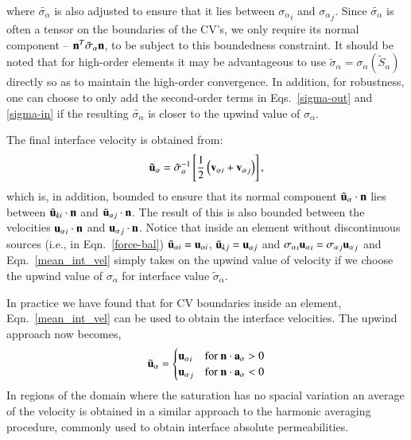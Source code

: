 \documentclass[preprint,authoryear,12pt]{elsarticle}
\newcommand{\jrp}[1]{\todo[color=blue!30, size=\small]{JRP: #1}}
\begin{document}
where $\tilde{\sigma_{\alpha}}$ is also adjusted to ensure that it lies between ${\sigma_\alpha}_i$ and ${\sigma_\alpha}_j$. Since $\tilde{\sigma_{\alpha}}$ is often a tensor on the boundaries of the CV's, we only require its normal component -- ${\bf n}^T\tilde\sigma_\alpha {\bf n}$, to be subject to this boundedness constraint. It should be noted that for high-order elements it may be advantageous to use $\tilde\sigma_\alpha = \sigma_\alpha \left(\tilde S_\alpha\right)$ directly so as to maintain the high-order convergence. In addition, for robustness, one can choose to only add the second-order terms in Eqs.~\ref{sigma-out} and \ref{sigma-in} if the resulting $\tilde{\sigma_{\alpha}}$ is closer to the upwind value of $\sigma_\alpha$.

The final interface velocity is obtained from:
\begin{equation}
  {\tilde{\bf u}_{\alpha}} = {\tilde{\sigma}_{\alpha}}^{-1} \left[\displaystyle\frac{1}{2} \left(    {{\bf v}_\alpha}_i +  {{\bf v}_\alpha}_j \right)\right],
  \label{mean_int_vel}  
\end{equation} 
which is, in addition, bounded to ensure that its normal component ${\tilde{\bf u}_\alpha}\cdot {\bf n}$ lies between ${\tilde{\bf u}_{ki}}\cdot {\bf n}$ and ${\tilde{\bf u}_{\alpha j}}\cdot {\bf n}$. The result of this is also bounded between the velocities ${{\bf u}_\alpha}_i\cdot {\bf n}$ and ${{\bf u}_\alpha}_j\cdot {\bf n}$. Notice that inside an element without discontinuous sources (i.e., in Eqn.~\ref{force-bal}) ${\tilde{\bf u}_{\alpha i}}={{\bf u}_{\alpha i}}$, ${\tilde{\bf u}_{kj}}={{\bf u}_{\alpha j}}$ and ${\sigma_\alpha}_i {{\bf u}_\alpha}_i = {\sigma_\alpha}_j {{\bf u}_\alpha}_j$ and Eqn.~\ref{mean_int_vel} simply takes on the upwind value of velocity if we choose the upwind value of $\sigma_\alpha$ for interface value $\tilde\sigma_\alpha$.

In practice we have found that for CV boundaries inside an element, Eqn.~\ref{mean_int_vel} can be used to obtain the interface velocities. The upwind approach now becomes,
\begin{equation}
{\tilde{\bf u}_{\alpha}} =
\begin{cases}
{{\bf u}_{\alpha}}_{i} & \text{for }{\bf n}\cdot {\bf a}_{\alpha} > 0 \\
{{\bf u}_{\alpha}}_{j} & \text{for }{\bf n}\cdot {\bf a}_{\alpha} < 0 
\end{cases}
\end{equation}
In regions of the domain where the saturation has no spacial variation an average of the velocity is obtained in a similar approach to the harmonic averaging procedure, commonly used to obtain interface absolute permeabilities.\jrp{add a reference?}
\end{document}
